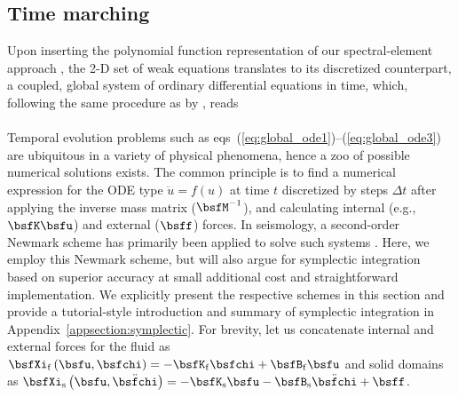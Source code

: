 \subsection{Time marching}
Upon inserting the polynomial function representation of our spectral-element
approach \citep[][eqs~(12)--(13)]{nissen+:07b}, the 2-D set of weak equations 
translates to its discretized counterpart, a coupled, global system of 
ordinary differential equations in time, which, following the same procedure 
as by \citet[][Section~4]{nissen+:07b}, reads 
%
\eqa \label{eq:global_ode}
\label{eq:global_ode1}\\
\label{eq:global_ode2}\\
\label{eq:global_ode3}
\ena
%
Temporal evolution problems such as 
eqs~(\ref{eq:global_ode1})--(\ref{eq:global_ode3}) are ubiquitous in a 
variety of physical phenomena, hence a zoo of possible numerical 
solutions exists. 
The common principle is to find a numerical expression for the ODE type
$\ddot{u}=f(u)$ at time $t$ discretized by steps $\Delta t$
after applying the inverse mass matrix ($\bsfM^{-1}$), and calculating
internal (e.g., $\bsfK\bsfu$) and external ($\bsff$) forces.
In seismology, a second-order Newmark scheme has primarily been applied to 
solve such systems \citep{KoVi98}. 
Here, we employ this Newmark scheme, but will also argue for symplectic 
integration based on superior accuracy at small additional cost and 
straightforward implementation. We explicitly present the respective schemes 
in this section and provide a tutorial-style introduction and summary of 
symplectic integration in Appendix~\ref{appsection:symplectic}. 
For brevity, let us concatenate internal and external forces for the 
fluid as 
$\bsfXi_{\rm f}\left(\bsfu,\bsfchi\right)=
-\bsfK_{\rm f}\bsfchi+\bsfB_{\rm f}\bsfu$ and solid domains as
$\bsfXi_{\rm s}\left(\bsfu,\ddot{\bsfchi}\right)=
-\bsfK_{\rm s}\bsfu-\bsfB_{\rm s}
\ddot{\bsfchi}
+\bsff$.
%
%
